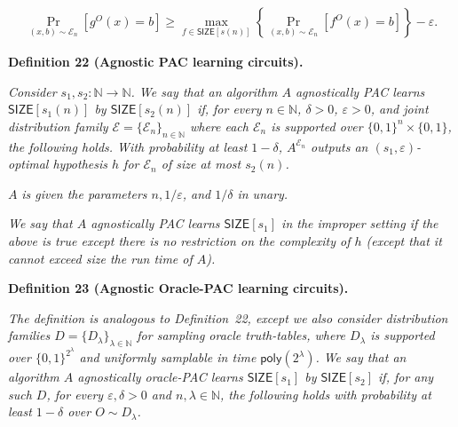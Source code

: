 \[\begin{gathered}
\Pr_{(x,b)\sim\mathcal{E}_{n}}[g^{O}(x)=b]\geq\max_{f\in{\mathsf{SIZE}}[s(n)]}\left\{\Pr_{(x,b)\sim\mathcal{E}_{n}}[f^{O}(x)=b]\right\}-\varepsilon.
\end{gathered}\]







\par\medskip\noindent\textbf{
\textbf{Definition 22}\textbf{ }(Agnostic PAC learning circuits)\textbf{.}
}\par



\emph{Consider $s_{1},s_{2}:\mathbb{N}\to\mathbb{N}$. We say that an algorithm $A$ agnostically PAC learns ${\mathsf{SIZE}}[s_{1}(n)]$ by ${\mathsf{SIZE}}[s_{2}(n)]$ if, for every $n\in\mathbb{N}$, $\delta>0$, $\varepsilon>0$, and joint distribution family $\mathcal{E}=\{\mathcal{E}_{n}\}_{n\in\mathbb{N}}$ where each $\mathcal{E}_{n}$ is supported over $\{0,1\}^{n}\times\{0,1\}$, the following holds. With probability at least $1-\delta$, $A^{\mathcal{E}_{n}}$ outputs an $(s_{1},\varepsilon)$-optimal hypothesis $h$ for $\mathcal{E}_{n}$ of size at most $s_{2}(n)$.}\par




$A$\emph{ is given the parameters $n,1/\varepsilon$, and $1/\delta$ in unary.}\par




\emph{We say that $A$ agnostically PAC learns ${\mathsf{SIZE}}[s_{1}]$ in the improper setting if the above is true except there is no restriction on the complexity of $h$ (except that it cannot exceed size the run time of $A$).}\par







\par\medskip\noindent\textbf{
\textbf{Definition 23}\textbf{ }(Agnostic Oracle-PAC learning circuits)\textbf{.}
}\par



\emph{The definition is analogous to Definition 22, except we also consider distribution families $D=\{D_{\lambda}\}_{\lambda\in\mathbb{N}}$ for sampling oracle truth-tables, where $D_{\lambda}$ is supported over $\{0,1\}^{2^{\lambda}}$ and uniformly samplable in time ${\mathsf{poly}}(2^{\lambda})$. We say that an algorithm $A$ agnostically oracle-PAC learns ${\mathsf{SIZE}}[s_{1}]$ by ${\mathsf{SIZE}}[s_{2}]$ if, for any such $D$, for every $\varepsilon,\delta>0$ and $n,\lambda\in\mathbb{N}$, the following holds with probability at least $1-\delta$ over $O\sim D_{\lambda}$.}\par




